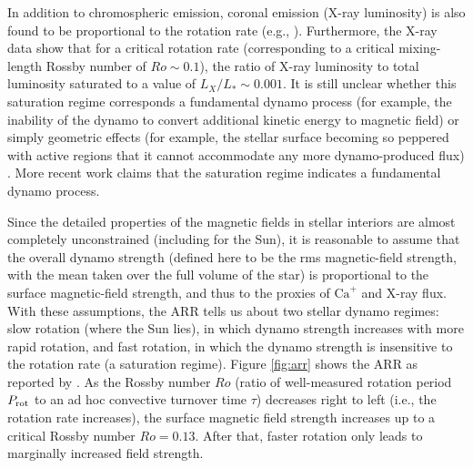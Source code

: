 \documentclass[12pt]{article} %
\begin{document}
In addition to chromospheric emission, coronal emission (X-ray luminosity) is also found to be proportional to the rotation rate (e.g., \citealt{Walter1982}). Furthermore, the X-ray data show that for a critical rotation rate (corresponding to a critical mixing-length Rossby number of $Ro\sim0.1$), the ratio of X-ray luminosity to total luminosity saturated to a value of $L_X/L_*\sim0.001$. It is still unclear whether this saturation regime corresponds a fundamental dynamo process (for example, the inability of the dynamo to convert additional kinetic energy to magnetic field) or simply geometric effects (for example, the stellar surface becoming so peppered with active regions that it cannot accommodate any more dynamo-produced flux) \citep{Jardine1999}. More recent work \citep{Reiners2022} claims that the saturation regime indicates a fundamental dynamo process.

Since the detailed properties of the magnetic fields in stellar interiors are almost completely unconstrained (including for the Sun), it is reasonable to assume that the overall dynamo strength (defined here to be the rms magnetic-field strength, with the mean taken over the full volume of the star) is proportional to the surface magnetic-field strength, and thus to the proxies of $\text{Ca}^+$ and X-ray flux. With these assumptions, the ARR tells us about two stellar dynamo regimes: slow rotation (where the Sun lies), in which dynamo strength increases with more rapid rotation, and fast rotation, in which the dynamo strength is insensitive to the rotation rate (a saturation regime). Figure \ref{fig:arr} shows the ARR as reported by \citet{Reiners2022}. As the Rossby number $Ro$ (ratio of well-measured rotation period $P_{\rm{rot}}$ to an ad hoc convective turnover time $\tau$) decreases right to left (i.e., the rotation rate increases), the surface magnetic field strength increases up to a critical Rossby number $Ro=0.13$. After that, faster rotation only leads to marginally increased field strength.
\end{document}
